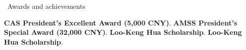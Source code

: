 \begin{rubric}{\faMedal\ Awards and achievements}

%
\entry*[2026/07] 
\textbf{CAS President’s Excellent Award (5,000 CNY)}. 
\entry*[2025/09] 
    \textbf{AMSS President’s Special Award (32,000 CNY)}. 
\entry*[2024/09] 
    \textbf{Loo-Keng Hua Scholarship}. 
\entry*[2021/09] 
    \textbf{Loo-Keng Hua Scholarship}. 

\end{rubric}



